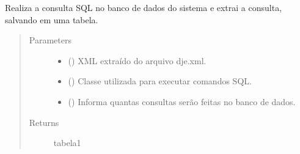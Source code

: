 \documentclass[letterpaper,10pt,english]{sphinxmanual}
\begin{document}
\begin{fulllineitems}
\label{\detokenize{ConsultaDje:ConsultaDje.consultas}}
Realiza a consulta SQL no banco de dados do sistema e extrai a consulta, salvando em uma tabela.
\begin{quote}\begin{description}
\item[{Parameters}] \leavevmode\begin{itemize}
\item {} 
 () \textendash{} XML extraído do arquivo dje.xml.

\item {} 
 () \textendash{} Classe utilizada para executar comandos SQL.

\item {} 
 () \textendash{} Informa quantas consultas serão feitas no banco de dados.

\end{itemize}

\item[{Returns}] \leavevmode
tabela1

\end{description}\end{quote}

\end{fulllineitems}

\end{document}
